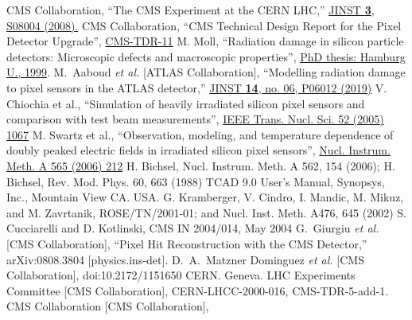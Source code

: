 \begin{thebibliography}{99}
   CMS Collaboration,
  ``The CMS Experiment at the CERN LHC,''
    \href{https://iopscience.iop.org/article/10.1088/1748-0221/3/08/S08004/meta}{ JINST {\bf 3}, S08004 (2008).}
    CMS Collaboration, ``CMS Technical Design Report for the Pixel Detector Upgrade'', \href{http://cds.cern.ch/record/1481838}{CMS-TDR-11}
    M. Moll, ``Radiation damage in silicon particle detectors: Microscopic defects and macroscopic properties'', \href{http://www-library.desy.de/cgi-bin/showprep.pl?desy-thesis99-040}{PhD thesis: Hamburg U., 1999}.
  M.~Aaboud {\it et al.} [ATLAS Collaboration],
  ``Modelling radiation damage to pixel sensors in the ATLAS detector,''
  \href{https://arxiv.org/pdf/1905.03739.pdf}{JINST {\bf 14}, no. 06, P06012 (2019)}
    V. Chiochia et al., ``Simulation of heavily irradiated silicon pixel sensors and comparison with test beam measurements'', \href{https://ieeexplore.ieee.org/document/1495807}{IEEE Trans. Nucl. Sci. 52 (2005) 1067}
    M. Swartz et al., ``Observation, modeling, and temperature dependence of doubly peaked electric fields in irradiated silicon pixel sensors'',
    \href{http://www.sciencedirect.com/science/article/pii/S0168900206007583}{Nucl. Instrum. Meth. A 565 (2006) 212}
    H. Bichsel, Nucl. Instrum. Meth. A 562, 154 (2006); H. Bichsel, Rev. Mod. Phys. 60, 663 (1988)
    TCAD 9.0 User’s Manual, Synopsys, Inc., Mountain View CA. USA.
    G. Kramberger, V. Cindro, I. Mandic, M. Mikuz, and M. Zavrtanik, ROSE/TN/2001-01; and Nucl. Inst. Meth. A476, 645 (2002)
    S. Cucciarelli and D. Kotlinski, CMS IN 2004/014, May 2004
    G.~Giurgiu {\it et al.} [CMS Collaboration],
    ``Pixel Hit Reconstruction with the CMS Detector,''
    arXiv:0808.3804 [physics.ins-det].
  D.~A.~Matzner Dominguez {\it et al.} [CMS Collaboration],
  doi:10.2172/1151650
  CERN. Geneva. LHC Experiments Committee [CMS Collaboration],
  CERN-LHCC-2000-016, CMS-TDR-5-add-1.
  CMS Collaboration [CMS Collaboration],

\end{thebibliography}
